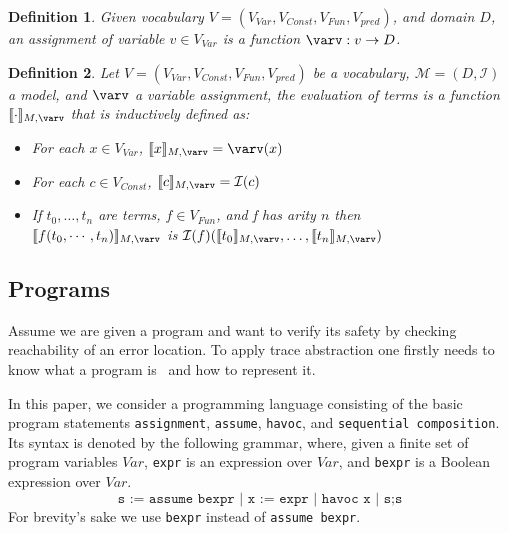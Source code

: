 \documentclass{article}
\newcommand{\Var}{\ensuremath{\mathit{Var}}\xspace}
\newcommand{\vocab}[1]{\ensuremath{V_{\mathit{#1}}}\xspace}
\newcommand{\interpret}{\ensuremath{\mathcal{I}}\xspace}
\newcommand{\eval}[1]{\ensuremath{\llbracket #1 \rrbracket}_{M, \varv}\xspace}
\newtheorem{mydef}{Definition}
\newcommand\mycom[1]{}
\newcommand\mycom[1]{#1}
\newcommand{\jw}[1]{\mycom{\todo[color=blue!40,inline]{\small JW: #1}}}
\newcommand{\dd}[1]{\mycom{\todo[color=orange!40,inline]{\small DD: #1}}}
\begin{document}
\begin{mydef}
	Given vocabulary $V = (\vocab{Var}, \vocab{Const}, \vocab{Fun}, \vocab{pred})$, and domain $D$, an assignment of variable $v \in \vocab{Var}$ is a function $\varv: v \rightarrow D$.
\end{mydef}

\begin{mydef}
	Let $V = (\vocab{Var}, \vocab{Const}, \vocab{Fun}, \vocab{pred})$ be a vocabulary, $\mathcal{M} = (D, \interpret)$ a model, and $\varv$ a variable assignment, the evaluation of terms is a function $\eval{\cdot}$ that is inductively defined as:
	\begin{itemize}
		\item For each $x \in \vocab{Var}$, $\eval{x} = \varv(x)$
		\item For each $c \in \vocab{Const}$, $\eval{c} = \interpret(c)$
		\item If $t_0, \ldots, t_n$ are terms, $f \in \vocab{Fun}$, and f has arity $n$ then \\ $\eval{f(t_0, \cdots, t_n)}$ is $\interpret(f)(\eval{t_0}, \ldots, \eval{t_n})$
	\end{itemize}
\end{mydef}

\subsection{Programs}

\jw{TODO: Bring this chapter in harmony with the previous.}

Assume we are given a program and want to verify its safety by checking reachability of an error location.
To apply trace abstraction one firstly needs to know what a program is~\cite{DBLP:journals/corr/GreitschusDP17} and how to represent it.

In this paper, we consider a programming language consisting of the basic program statements \texttt{assignment}, \texttt{assume}, \texttt{havoc}, and \texttt{sequential composition}.
Its syntax is denoted by the following grammar, where, given a finite set of program variables \Var, \texttt{expr} is an expression over \Var, and \texttt{bexpr} is a Boolean expression over \Var.
\begin{equation*}
	\texttt{s := assume bexpr | x := expr | havoc x | s;s}
\end{equation*}
For brevity's sake we use \texttt{bexpr} instead of \texttt{assume bexpr}.
\end{document}
